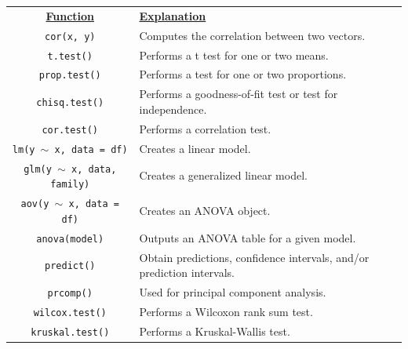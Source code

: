 \documentclass[11pt]{article}
\begin{document}
\begin{tabular}{clcc}
	\underline{\bf Function} & \underline{\bf Explanation}\\
		\texttt{cor(x, y)} & Computes the correlation between two vectors.\\
		\texttt{t.test()} & Performs a t test for one or two means.\\
		\texttt{prop.test()} & Performs a test for one or two proportions.\\
		\texttt{chisq.test()} & Performs a goodness-of-fit test or test for independence.\\
		\texttt{cor.test()} & Performs a correlation test.\\
		\texttt{lm(y $\sim$ x, data = df)} & Creates a linear model.\\
		\texttt{glm(y $\sim$ x, data, family)} & Creates a generalized linear model.\\
		\texttt{aov(y $\sim$ x, data = df)} & Creates an ANOVA object.\\
		\texttt{anova(model)} & Outputs an ANOVA table for a given model.\\
		\texttt{predict()} & Obtain predictions, confidence intervals, and/or prediction intervals.\\
		\texttt{prcomp()} & Used for principal component analysis. \\
		\texttt{wilcox.test()} & Performs a Wilcoxon rank sum test. \\
		\texttt{kruskal.test()} & Performs a Kruskal-Wallis  test. \\
\end{tabular}
\end{document}
